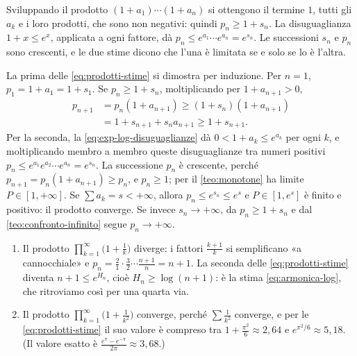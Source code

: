 \begin{strategia}
Sviluppando il prodotto $(1+a_{1})\cdots(1+a_{n})$ si ottengono il termine $1$, tutti gli $a_{k}$ e
i loro prodotti, che sono non negativi: quindi $p_{n}\ge1+s_{n}$. La disuguaglianza
$1+x\le e^{x}$, applicata a ogni fattore, dà $p_{n}\le e^{a_{1}}\cdots e^{a_{n}}=e^{s_{n}}$. Le successioni $s_{n}$
e $p_{n}$ sono crescenti, e le due stime dicono che l'una è limitata se e solo se lo è
l'altra.
\end{strategia}

\begin{dimostrazione}
La prima delle \eqref{eq:prodotti-stime} si dimostra per induzione. Per $n=1$,
$p_{1}=1+a_{1}=1+s_{1}$. Se $p_{n}\ge1+s_{n}$, moltiplicando per $1+a_{n+1}>0$,
\[
  \begin{aligned}
  p_{n+1}&=p_{n}(1+a_{n+1})\ge(1+s_{n})(1+a_{n+1})\\
  &=1+s_{n+1}+s_{n}a_{n+1}\ge1+s_{n+1} .
  \end{aligned}
\]
Per la seconda, la \eqref{eq:exp-log-disuguaglianze} dà $0<1+a_{k}\le e^{a_{k}}$ per ogni $k$, e
moltiplicando membro a membro queste disuguaglianze tra numeri positivi
$p_{n}\le e^{a_{1}}e^{a_{2}}\cdots e^{a_{n}}=e^{s_{n}}$. La successione $p_{n}$ è crescente, perché
$p_{n+1}=p_{n}(1+a_{n+1})\ge p_{n}$, e $p_{n}\ge1$; per il \cref{teo:monotone} ha limite $P\in[1,+\infty]$.
Se $\sum a_{k}=s<+\infty$, allora $p_{n}\le e^{s_{n}}\le e^{s}$ e $P\in[1,e^{s}]$ è finito e positivo: il
prodotto converge. Se invece $s_{n}\to+\infty$, da $p_{n}\ge1+s_{n}$ e dal
\cref{teo:confronto-infinito} segue $p_{n}\to+\infty$.
\end{dimostrazione}

\begin{esempio}\label{es:prodotti-infiniti}
\begin{enumerate}[label=(\alph*)]
  \item Il prodotto $\prod_{k=1}^{\infty}\bigl(1+\frac1k\bigr)$ diverge: i fattori $\frac{k+1}k$ si semplificano «a
  cannocchiale» e $p_{n}=\frac21\cdot\frac32\cdots\frac{n+1}n=n+1$. La seconda delle \eqref{eq:prodotti-stime}
  diventa $n+1\le e^{H_{n}}$, cioè $H_{n}\ge\log(n+1)$: è la stima \eqref{eq:armonica-log}, che
  ritroviamo così per una quarta via.
  \item Il prodotto $\prod_{k=1}^{\infty}\bigl(1+\frac1{k^{2}}\bigr)$ converge, perché $\sum\frac1{k^{2}}$ converge, e per le
  \eqref{eq:prodotti-stime} il suo valore è compreso tra $1+\frac{\pi^{2}}6\approx2{,}64$ e
  $e^{\pi^{2}/6}\approx5{,}18$. (Il valore esatto è $\frac{e^{\pi}-e^{-\pi}}{2\pi}\approx3{,}68$.)
\end{enumerate}
\end{esempio}


